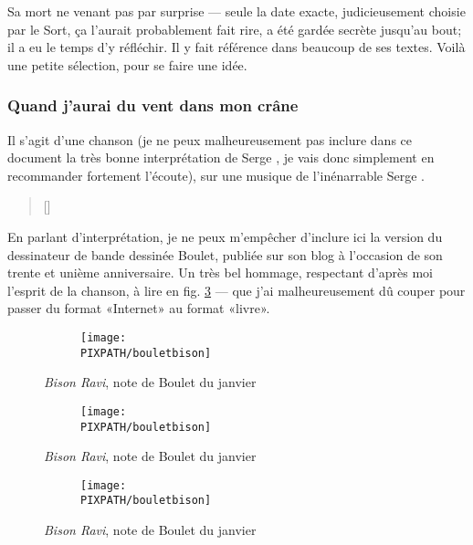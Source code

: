 Sa mort ne venant pas par surprise --- seule la date exacte,
judicieusement choisie par le Sort, ça l'aurait probablement fait rire,
a été gardée secrète jusqu'au bout; il a eu le temps d'y réfléchir. Il y
fait référence dans beaucoup de ses textes. Voilà une petite sélection,
pour se faire une idée.

\subsubsection{Quand j'aurai du vent dans mon crâne}

Il s'agit d'une chanson
(je ne peux malheureusement pas inclure dans ce document
la très bonne interprétation de Serge , je vais donc simplement
en recommander fortement l'écoute), sur une musique de l'inénarrable Serge .

\begin{multicols}{2}
{\footnotesize
\settowidth{\versewidth}{Quand j'aurai du vent dans mon crâne}
\begin{verse}[\versewidth]

\end{verse}
}
\end{multicols}

En parlant d'interprétation, je ne peux m'empêcher d'inclure ici la version
du dessinateur de bande dessinée Boulet, publiée sur son blog à l'occasion
de son trente et unième anniversaire. Un très bel hommage, respectant
d'après moi l'esprit de la chanson, à lire en fig. \ref{boulet}%
--- que j'ai malheureusement dû couper pour passer du format «Internet» au format «livre».

\begin{figure}[!htb]
\centering
\begin{subfigure}[b]{\textwidth}
\texttt{[image: \\PIXPATH/bouletbison]}%
\end{subfigure}
\caption{\emph{Bison Ravi}, note de Boulet du  janvier }
\label{boulet}
\end{figure}
\begin{figure}[!htb]
\ContinuedFloat
\centering
\begin{subfigure}[b]{\textwidth}
\texttt{[image: \\PIXPATH/bouletbison]}%
\end{subfigure}
\caption{\emph{Bison Ravi}, note de Boulet du  janvier }
\label{boulet}
\end{figure}
\eject
\begin{figure}[!htb]
\ContinuedFloat
\centering
\begin{subfigure}[b]{\textwidth}
\texttt{[image: \\PIXPATH/bouletbison]}%
\end{subfigure}
\caption{\emph{Bison Ravi}, note de Boulet du  janvier }
\label{boulet}
\end{figure}
\eject
\FloatBarrier

